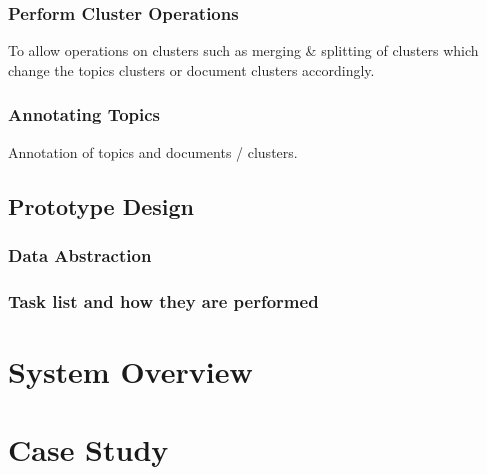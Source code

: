 \documentclass[10pt,journal,compsoc]{IEEEtran}
\begin{document}
\subsubsection{Perform Cluster Operations}
To allow operations on clusters such as merging \& splitting of clusters which change the topics clusters or document clusters accordingly.

\subsubsection{Annotating Topics}
Annotation of topics and documents / clusters.


\subsection{Prototype Design}
\subsubsection{Data Abstraction}

\subsubsection{Task list and how they are performed}

\section{System Overview}

\section{Case Study}


%
%
\end{document}
